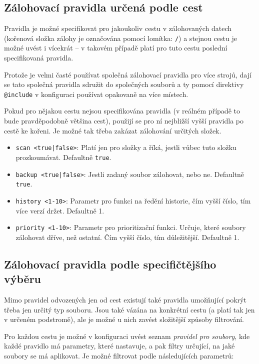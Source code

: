 \subsection{Zálohovací pravidla určená podle cest}

Pravidla je možné specifikovat pro jakoukoliv cestu v zálohovaných datech
(kořenová složka zálohy je označována pomocí lomítka: \texttt{/}) a stejnou
cestu je možné uvést i vícekrát -- v takovém případě platí pro tuto cestu
poslední specifikovaná pravidla.

Protože je velmi časté používat společná zálohovací pravidla pro více strojů,
dají se tato společná pravidla sdružit do společných souborů a ty pomocí
direktivy \texttt{@include} v konfiguraci používat opakovaně na více místech.

Pokud pro nějakou cestu nejsou specifikována pravidla (v reálném případě to bude
pravděpodobně většina cest), použijí se pro ní nejbližší vyšší pravidla po cestě
ke kořeni. Je možné tak třeba zakázat zálohování určitých složek.

\medskip

\begin{itemize}
	\item {\tt scan <true|false>}: Platí jen pro složky a říká, jestli vůbec
	tuto složku prozkoumávat. Defaultně {\tt true}.
	\item {\tt backup <true|false>}: Jestli zadaný soubor zálohovat, nebo
	ne. Defaultně {\tt true}.
	\item {\tt history <1-10>}: Parametr pro funkci na ředění historie, čím
	vyšší číslo, tím více verzí držet. Defaultně 1.
	\item {\tt priority <1-10>}: Parametr pro prioritizační funkci. Určuje,
	které soubory zálohovat dříve, než ostatní. Čím vyšší číslo, tím
	důležitější. Defaultně 1.
\end{itemize}

\subsection{Zálohovací pravidla podle specifičtějšího výběru}

Mimo pravidel odvozených jen od cest existují také pravidla umožňující pokrýt
třeba jen určitý typ souboru. Jsou také vázána na konkrétní cestu (a platí tak
jen v určeném podstromě), ale je možné u nich zavést složitější způsoby
filtrování.

Pro každou cestu je možné v konfiguraci uvést seznam {\it pravidel pro soubory},
kde každé pravidlo má parametry, které nastavuje, a pak filtry určující, na jaké
soubory se má aplikovat. Je možné filtrovat podle následujících parametrů:

